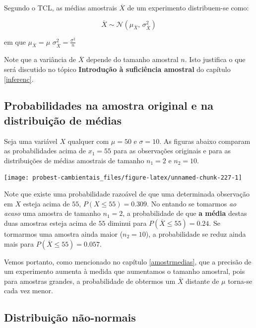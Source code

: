 \documentclass[
]{book}
\begin{document}
Segundo o TCL, as médias amostrais \(\overline{X}\) de um experimento distribuem-se como:

\[\overline{X} \sim \mathcal{N}(\mu_{\overline{X}},\,\sigma^{2}_{\overline{X}})\]

em que \(\mu_{\overline{X}} = \mu\) \(\sigma^{2}_{\overline{X}} = \frac{\sigma^2}{n}\)

Note que a variância de \(\overline{X}\) depende do tamanho amostral \(n\). Isto justifica o que será discutido no tópico \textbf{Introdução à suficiência amostral} do capítulo \ref{inferenc}.

\hypertarget{probabilidades-na-amostra-original-e-na-distribuiuxe7uxe3o-de-muxe9dias}{%
\subsection{Probabilidades na amostra original e na distribuição de médias}\label{probabilidades-na-amostra-original-e-na-distribuiuxe7uxe3o-de-muxe9dias}}

Seja uma variável \(X\) qualquer com \(\mu = 50\) e \(\sigma = 10\). As figuras abaixo comparam as probabilidades acima de \(x_1 = 55\) para as observações originais e para as distribuições de médias amostrais de tamanho \(n_1 = 2\) e \(n_2 = 10\).

\begin{center}\texttt{[image: probest-cambientais\_files/figure-latex/unnamed-chunk-227-1]} \end{center}

Note que existe uma probabilidade razoável de que uma determinada observação em \(X\) esteja acima de \(55\), \(P(X \leq 55) = 0.309\). No entando se tomarmos \emph{ao acaso} uma amostra de tamanho \(n_1 = 2\), a probabilidade de que \textbf{a média} destas duas amostras esteja acima de \(55\) diminui para \(P(\overline{X} \leq 55) = 0.24\). Se tormarmos uma amostra ainda maior (\(n_2 = 10\)), a probabilidade se reduz ainda mais para \(P(\overline{X} \leq 55) = 0.057\).

Vemos portanto, como mencionado no capítulo \ref{amostrmedias}, que a precisão de um experimento aumenta à medida que aumentamos o tamanho amostral, pois para amostras grandes, a probabilidade de obtermos um \(\overline{X}\) distante de \(\mu\) torna-se cada vez menor.

\hypertarget{distribuiuxe7uxe3o-nuxe3o-normais}{%
\subsection{Distribuição não-normais}\label{distribuiuxe7uxe3o-nuxe3o-normais}}
\end{document}

